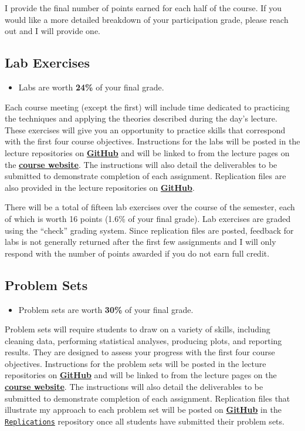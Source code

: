 \documentclass[
]{book}
\newenvironment{rmdblock}[1]
  {\begin{shaded*}
  \begin{itemize}
  \renewcommand{\labelitemi}{
    \raisebox{-.7\height}[0pt][0pt]{
      {\setkeys{Gin}{width=3em,keepaspectratio}\texttt{[image: images/\#1]}}
    }
  }
  \item
  }
  {
  \end{itemize}
  \end{shaded*}
  }
\newenvironment{rmdtip}
  {\begin{rmdblock}{tip}}
  {\end{rmdblock}}
\begin{document}
I provide the final number of points earned for each half of the course. If you would like a more detailed breakdown of your participation grade, please reach out and I will provide one.

\hypertarget{lab-exercises}{%
\subsection{Lab Exercises}\label{lab-exercises}}

\begin{rmdtip}
Labs are worth \textbf{24\%} of your final grade.
\end{rmdtip}

Each course meeting (except the first) will include time dedicated to practicing the techniques and applying the theories described during the day's lecture. These exercises will give you an opportunity to practice skills that correspond with the first four course objectives. Instructions for the labs will be posted in the lecture repositories on \href{https://github.com/slu-soc5650}{\textbf{GitHub}} and will be linked to from the lecture pages on the \href{https://slu-soc5650.github.io/}{\textbf{course website}}. The instructions will also detail the deliverables to be submitted to demonstrate completion of each assignment. Replication files are also provided in the lecture repositories on \href{https://github.com/slu-soc5650}{\textbf{GitHub}}.

There will be a total of fifteen lab exercises over the course of the semester, each of which is worth 16 points (1.6\% of your final grade). Lab exercises are graded using the ``check'' grading system. Since replication files are posted, feedback for labs is not generally returned after the first few assignments and I will only respond with the number of points awarded if you do not earn full credit.

\hypertarget{problem-sets}{%
\subsection{Problem Sets}\label{problem-sets}}

\begin{rmdtip}
Problem sets are worth \textbf{30\%} of your final grade.
\end{rmdtip}

Problem sets will require students to draw on a variety of skills, including cleaning data, performing statistical analyses, producing plots, and reporting results. They are designed to assess your progress with the first four course objectives. Instructions for the problem sets will be posted in the lecture repositories on \href{https://github.com/slu-soc5650}{\textbf{GitHub}} and will be linked to from the lecture pages on the \href{https://slu-soc5650.github.io/}{\textbf{course website}}. The instructions will also detail the deliverables to be submitted to demonstrate completion of each assignment. Replication files that illustrate my approach to each problem set will be posted on \href{https://github.com/slu-soc5650}{\textbf{GitHub}} in the \href{https://github.com/slu-soc5650/Replications}{\texttt{Replications}} repository once all students have submitted their problem sets.
\end{document}
